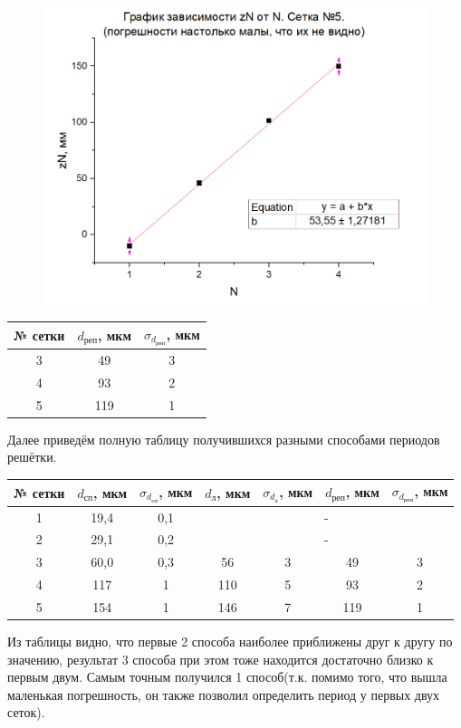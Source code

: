 \documentclass[a4paper,12pt]{article}
\begin{document}
\begin{figure}[H]
\centering
\includegraphics[scale=0.65]{graph3.png}

\end{figure}

\begin{table}[H]
\centering
\begin{tabular}{|c|c|c|}
\hline
 № сетки & $d_\text{реп}$, мкм & $\sigma_{d_\text{реп}}$, мкм \\ \hline
 3 & 49 & 3 \\ \hline
 4 & 93 & 2 \\ \hline
 5 & 119 & 1 \\ \hline
\end{tabular}
\end{table}

Далее приведём полную таблицу получившихся разными способами периодов решётки.

\begin{table}[H]
\centering
	\begin{tabular}{|c|c|c|c|c|c|c|}
	\hline
	№ сетки & $d_\text{сп}$, мкм & $\sigma_{d_\text{сп}}$, мкм & $d_\text{л}$, мкм & $\sigma_{d_\text{л}}$, мкм & $d_\text{реп}$, мкм & $\sigma_{d_\text{реп}}$, мкм \\ \hline
	1 & 19,4 & 0,1 & \multicolumn{4}{|c|}{-} \\ \hline
	2 & 29,1 & 0,2 & \multicolumn{4}{|c|}{-} \\ \hline
	3 & 60,0 & 0,3 & 56 & 3 & 49 & 3  \\ \hline
	4 & 117 & 1 & 110 & 5 & 93 & 2 \\ \hline
	5 & 154 & 1 & 146 & 7 & 119 & 1 \\ \hline
	
	\end{tabular}
\end{table}
Из таблицы видно, что первые 2 способа наиболее приближены друг к другу по значению, результат 3 способа при этом тоже находится достаточно близко к первым двум. Самым точным получился 1 способ(т.к. помимо того, что вышла маленькая погрешность, он также позволил определить период у первых двух сеток).
\end{document}
